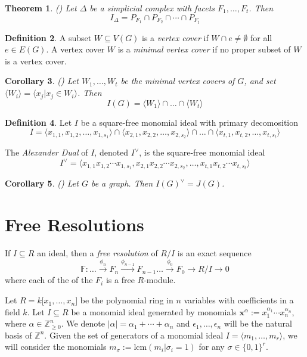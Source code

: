 \documentclass[paper=a4, fontsize=11pt]{scrartcl} %
\theoremstyle{plain}
\newtheorem{thm}{Theorem}[section]
\newtheorem{cor}[thm]{Corollary}
\theoremstyle{definition}
\newtheorem{defn}[thm]{Definition}
\begin{document}
\begin{thm} (\cite[Theorem 3.1.34]{Mo12}) Let $\Delta$ be a simplicial complex with facets $F_1, \dots, F_t$. Then $$I_{\Delta} = P_{F_1} \cap P_{F_2} \cap \cdots \cap P_{F_t}$$
\end{thm}

\begin{defn} A subset $W \subseteq V(G)$ is a \textit{vertex cover} if $W \cap e \neq \emptyset$ for all $e \in E(G)$. A vertex cover $W$ is a \textit{minimal vertex cover} if no proper subset of $W$ is a vertex cover.
\end{defn}

\begin{cor} (\cite[Corollary 3.1.35]{Mo12})
Let $W_1, \dots, W_t$ be the minimal vertex covers of $G$, and set $\langle W_i \rangle = \langle x_j \vert x_j \in W_i \rangle$. Then
$$I(G) = \langle W_1 \rangle \cap \dots \cap \langle W_t \rangle$$
\end{cor}

\begin{defn}
Let $I$ be a square-free monomial ideal with primary decomosition $$I = \langle x_{1,1}, x_{1,2}, \dots, x_{1,s_1} \rangle \cap \langle x_{2,1}, x_{2,2}, \dots, x_{2,s_2} \rangle \cap \dots \cap \langle x_{t,1}, x_{t,2}, \dots, x_{t,s_t} \rangle$$

The \textit{Alexander Dual} of $I$, denoted $I^{\vee}$, is the square-free monomial ideal $$I^{\vee} = \langle x_{1,1} x_{1,2} \cdots x_{1,s_1}, x_{2,1} x_{2,2} \cdots x_{2,s_2}, \dots, x_{t,1} x_{t,2} \cdots x_{t,s_t} \rangle$$
\end{defn}

\begin{cor} (\cite[Corollary 3.1.38]{Mo12})
Let $G$ be a graph. Then $I(G)^{\vee} = J(G)$.
\end{cor}

\section{Free Resolutions}
If $I \subseteq R$ an ideal, then a \textit{free resolution} of $R/I$ is an exact sequence $$\mathbb{F} : \dots \xrightarrow{\phi_{n}} F_n \xrightarrow{\phi_{n-1}} F_{n-1} \dots \xrightarrow{\phi_{0}} F_0 \rightarrow R/I \rightarrow 0$$ where each of the of the $F_i$ is a free $R$-module.

Let $R = k \lbrack x_1, \dots, x_n \rbrack$ be the polynomial ring in $n$ variables with coefficients in a field $k$. Let $I \subseteq R$ be a monomial ideal generated by monomials $\mathbf{x}^{\alpha} := x_{1}^{\alpha_{1}} \cdots x_{n}^{\alpha_{n}}$, where $\alpha \in \mathbb{Z}^{n}_{\geq 0}$. We denote $\vert \alpha \vert = \alpha_1 + \cdots + \alpha_n$ and $\epsilon_1,\dots, \epsilon_n$ will be the natural basis of $\mathbb{Z}^n$. Given the set of generators of a monomial ideal $I = \langle m_1, \dots, m_r \rangle$, we will consider the monomials $m_{\sigma} := \text{lcm} (m_i \vert \sigma_i = 1 )$ for any $\sigma \in \lbrace 0, 1 \rbrace^r$.
\end{document}
